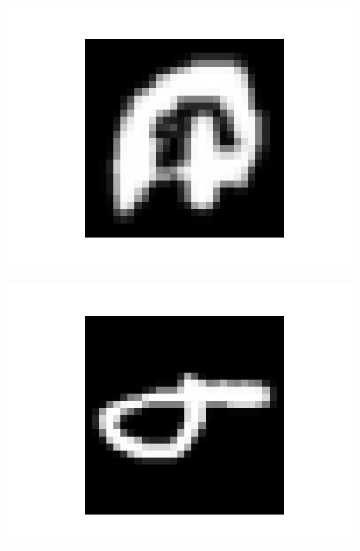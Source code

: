 \documentclass[14pt,a4paper]{extarticle}
\begin{document}
\begin{figure}[htb]
  \centering

  \begin{subfigure}[b]{0.3\textwidth}
    \includegraphics[width=\textwidth]{../res/emnist/sample_0.png}
    \label{fig:emnist_sample_0}
  \end{subfigure}
  \hfill
  \begin{subfigure}[b]{0.3\textwidth}
    \includegraphics[width=\textwidth]{../res/emnist/sample_1.png}
    \label{fig:emnist_sample_1}
  \end{subfigure}
  \hfill
  \begin{subfigure}[b]{0.3\textwidth}

\end{subfigure}
\end{figure}
\end{document}
